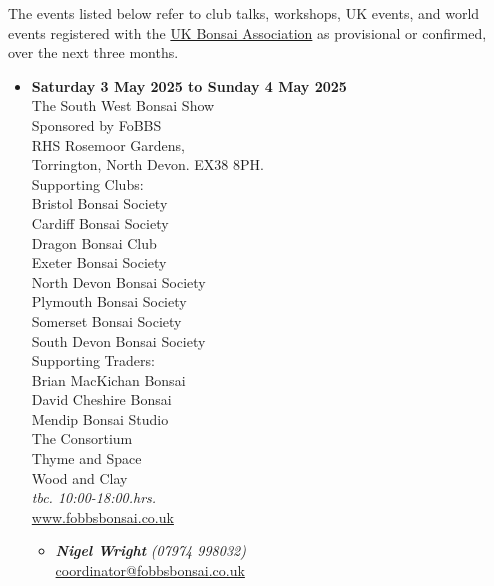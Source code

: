 \label{2025-05-events}

The events listed below refer to club talks, workshops, UK events, and world events registered with the \href{https://www.ukbonsaiassoc.org/events.html}{UK Bonsai Association} as provisional or confirmed, over the next three months.
\begin{itemize}

    \item \textbf{Saturday 3 May 2025 to Sunday 4 May 2025}
    \\
    The South West Bonsai Show \\
    Sponsored by FoBBS \\
    RHS Rosemoor Gardens, \\
    Torrington, North Devon. EX38 8PH. \\
    Supporting Clubs: \\
    Bristol Bonsai Society \\
    Cardiff Bonsai Society \\
    Dragon Bonsai Club \\
    Exeter Bonsai Society \\
    North Devon Bonsai Society \\
    Plymouth Bonsai Society \\
    Somerset Bonsai Society \\
    South Devon Bonsai Society \\
    Supporting Traders: \\
    Brian MacKichan Bonsai \\
    David Cheshire Bonsai \\
    Mendip Bonsai Studio \\
    The Consortium \\
    Thyme and Space \\
    Wood and Clay
    \\
    \emph{tbc. 10:00-18:00.hrs.}
    \\
    \href{https://www.fobbsbonsai.co.uk}{www.fobbsbonsai.co.uk}
    \begin{itemize}
        \item \textbf{\emph{Nigel Wright}} \emph{(07974 998032)} \\
        \href{mailto:coordinator@fobbsbonsai.co.uk}{coordinator@fobbsbonsai.co.uk} 
    \end{itemize}


\end{itemize}
